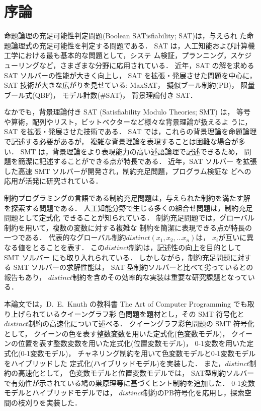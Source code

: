 \chapter{序論}
命題論理の充足可能性判定問題(Boolean SATisfiability; SAT)\cite{JSAI:InoueT10}は，与えられ
た命題論理式の充足可能性を判定する問題である．
SAT は，人工知能および計算機工学における最も基本的な問題として，システ
ム検証，プランニング，スケジューリングなど，さまざまな分野に応用されている．
近年，SAT の解を求める SAT ソルバーの性能が大きく向上し，
SAT を拡張・発展させた問題を中心に，SAT 技術が大きな広がりを見せている:
MaxSAT，
擬似ブール制約(PB)，
限量ブール式(QBF)，
モデル計数(\#SAT)，
背景理論付き SAT．

なかでも，背景理論付き SAT (Satisfiability Modulo Theories; SMT) \cite{JSAI:IwanumaN10}は，
等号や算術，配列やリスト，ビットベクターなど様々な背景理論が扱えるよ
うに，SAT を拡張・発展させた技術である．
SAT では，これらの背景理論を命題論理で記述する必要があるが，
複雑な背景理論を表現することは困難な場合が多い．
SMT は，背景理論をより表現能力の高い述語論理で記述できるため，
問題を簡潔に記述することができる点が特長である．
近年，SAT ソルバー
を拡張した高速 SMT ソルバーが開発され，制約充足問題，プログラム検証な
どへの応用が活発に研究されている．

制約プログラミングの言語である制約充足問題\cite{JSAI:TamuraTB10}は，与えられた制約を満たす解
を探索する問題である．
人工知能分野で生じる多くの組合せ問題は，制約充足問題として定式化
できることが知られている．
制約充足問題では，グローバル制約を用いて，複数の変数に対する複雑な
制約を簡潔に表現できる点が特長の一つである．
代表的なグローバル制約$distinct(x_{1},x_{2},\ldots x_{n})$は，
$x_{i}$が互いに異なる値をとることを表す．
この$distinct$制約は，記述性の向上を目的として SMT ソルバー
にも取り入れられている．
しかしながら，制約充足問題に対する SMT ソルバーの求解性能は，
SAT 型制約ソルバーと比べて劣っているとの報告もあり，
$distinct$制約を含めその効率的な実装は重要な研究課題となっている．

本論文では，D.~E.~Knuth の教科書
The Art of Computer Programming\cite{Knuth:TAOCP:SAT}
でも取り上げられているクイーングラフ彩
色問題を題材とし，その SMT 符号化と$distinct$制約の高速化について述べる．
クイーングラフ彩色問題の SMT 符号化として，
クイーンの色を表す整数変数を用いた定式化(色変数モデル)，
クイーンの位置を表す整数変数を用いた定式化(位置変数モデル)，
0-1変数を用いた定式化(0-1変数モデル)，
チャネリング制約を用いて色変数モデルと0-1変数モデルをハイブリッドした
定式化(ハイブリッドモデル)を実装した．
また，$distinct$制約の高速化として，
色変数モデルと位置変数モデルでは，
SAT型制約ソルバーで有効性が示されている鳩の巣原理等に基づくヒント制約を追加した．
0-1変数モデルとハイブリッドモデルでは，
$distinct$制約のPB符号化\cite{Ono19:ai}を応用し，探索空間の枝刈りを実装した．

